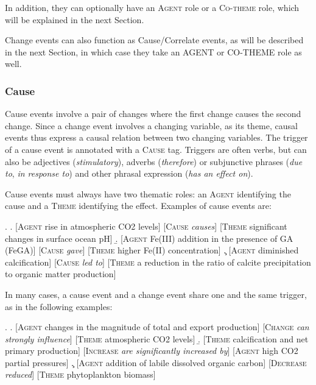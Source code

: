 \documentclass[10pt, a4paper]{article}
\newcommand{\tag}[1]{\textsc{#1}}
\begin{document}
In addition, they can optionally have an \tag{Agent} role or a \tag{Co-theme} role, which will be explained in the next Section.

Change events can also function as Cause/Correlate events, as will be described in the next Section, in which case they take an AGENT or CO-THEME role as well.


\subsubsection{Cause}

Cause events involve a pair of changes where the first change causes the second change.
Since a change event involves a changing variable, as its theme, causal events thus express a causal relation between two changing variables. 
The trigger of a cause event is annotated with a \tag{Cause} tag.
Triggers are often verbs, but can also be adjectives (\emph{stimulatory}), adverbs (\emph{therefore}) or subjunctive phrases (\emph{due to}, \emph{in response to}) and other phrasal expression (\emph{has an effect on}).  

Cause events must always have two thematic roles: an \tag{Agent} identifying the cause and a \tag{Theme} identifying the effect. 
Examples of cause events are:

\exi.
  \a. [\tag{Agent} rise in atmospheric CO2 levels] [\tag{Cause} \emph{causes}] [\tag{Theme} significant changes in surface ocean pH]
  \b. [\tag{Agent} Fe(III) addition in the presence of GA (FeGA)] [\tag{Cause} \emph{gave}] [\tag{Theme} higher Fe(II) concentration]
  \c. [\tag{Agent} diminished calcification] [\tag{Cause} \emph{led to}] [\tag{Theme} a reduction in the ratio of calcite precipitation to organic matter production]

In many cases, a cause event and a change event share one and the same trigger, as in the following examples:

\exi.
  \a. [\tag{Agent} changes in the magnitude of total and export production] [\tag{Change} \emph{can strongly influence}] [\tag{Theme} atmospheric CO2 levels]
  \b. [\tag{Theme} calcification and net primary production] [\tag{Increase} \emph{ are significantly increased by}] [\tag{Agent} high CO2 partial pressures]
  \c. [\tag{Agent} addition of labile dissolved organic carbon] [\tag{Decrease}  \emph{reduced}] [\tag{Theme} phytoplankton biomass]
\end{document}
